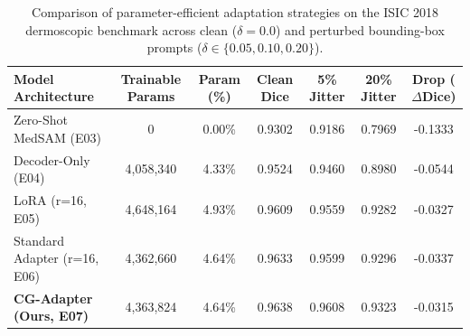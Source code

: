 \begin{table}[t]
\centering
\caption{Comparison of parameter-efficient adaptation strategies on the ISIC 2018 dermoscopic benchmark across clean ($\delta=0.0$) and perturbed bounding-box prompts ($\delta \in \{0.05, 0.10, 0.20\}$).}
\label{tab:peft_comparison}
\small
\begin{tabular}{lcccccc}
\hline
\textbf{Model Architecture} & \textbf{Trainable Params} & \textbf{Param (\%)} & \textbf{Clean Dice} & \textbf{5\% Jitter} & \textbf{20\% Jitter} & \textbf{Drop ($\Delta$Dice)} \\
\hline
Zero-Shot MedSAM (E03) & 0 & 0.00\% & 0.9302 & 0.9186 & 0.7969 & -0.1333 \\
Decoder-Only (E04) & 4,058,340 & 4.33\% & 0.9524 & 0.9460 & 0.8980 & -0.0544 \\
LoRA (r=16, E05) & 4,648,164 & 4.93\% & 0.9609 & 0.9559 & 0.9282 & -0.0327 \\
Standard Adapter (r=16, E06) & 4,362,660 & 4.64\% & 0.9633 & 0.9599 & 0.9296 & -0.0337 \\
\textbf{CG-Adapter (Ours, E07)} & 4,363,824 & 4.64\% & 0.9638 & 0.9608 & 0.9323 & -0.0315 \\
\hline
\end{tabular}
\end{table}
